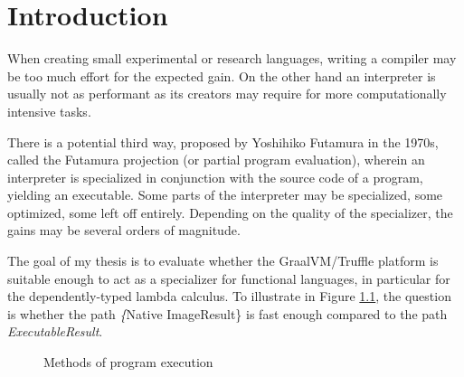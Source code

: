 \documentclass[english,zadani,odsaz]{fitthesis}
\date{\today}
\title{}
\begin{document}
\maketitle
\setlength{\parskip}{0pt}
{\hypersetup{hidelinks}\tableofcontents}
\iftotalfigures\listoffigures\fi
\iftotaltables\listoftables\fi
\iftotallistings\listoflistings\fi
\iftwoside\cleardoublepage\fi
\setlength{\parskip}{0.5\bigskipamount}

\chapter{Introduction}
\label{sec:org3fb8cda}
When creating small experimental or research languages, writing a compiler may
be too much effort for the expected gain. On the other hand an interpreter is
usually not as performant as its creators may require for more computationally
intensive tasks.

There is a potential third way, proposed by Yoshihiko Futamura in the 1970s,
called the Futamura projection (or partial program evaluation), wherein an
interpreter is specialized in conjunction with the source code of a program,
yielding an executable. Some parts of the interpreter may be specialized, some
optimized, some left off entirely. Depending on the quality of the specializer,
the gains may be several orders of magnitude.

The goal of my thesis is to evaluate whether the GraalVM/Truffle platform is
suitable enough to act as a specializer for functional languages, in particular
for the dependently-typed lambda calculus.  To illustrate in Figure
\ref{fig:futamora}, the question is whether the path \textit\{Native
Image\textrightarrow Result\} is fast enough compared to the path
\textit{Executable\textrightarrow Result}.

\begin{figure}
\centering
{}
\caption{Methods of program execution}
\label{fig:futamora}
\end{figure}
\end{document}
